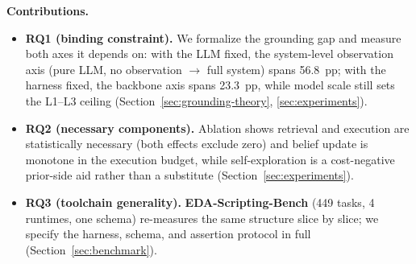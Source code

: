 \noindent\textbf{Contributions.}
\begin{itemize}
    \item \textbf{RQ1 (binding constraint).} We formalize the grounding gap and measure both
    axes it depends on: with the LLM fixed, the system-level observation axis (pure LLM, no
    observation $\to$ full system) spans 56.8~pp; with the harness fixed, the backbone axis
    spans 23.3~pp, while model scale still sets the L1--L3 ceiling
    (Section~\ref{sec:grounding-theory}, \ref{sec:experiments}).

    \item \textbf{RQ2 (necessary components).} Ablation shows retrieval and execution are statistically necessary (both effects exclude zero) and belief update is monotone in the execution budget, while self-exploration is a cost-negative prior-side aid rather than a substitute (Section~\ref{sec:experiments}).

    \item \textbf{RQ3 (toolchain generality).} \textbf{EDA-Scripting-Bench} (449 tasks, 4
    runtimes, one schema) re-measures the same structure slice by slice; we specify the
    harness, schema, and assertion protocol in full (Section~\ref{sec:benchmark}).
\end{itemize}